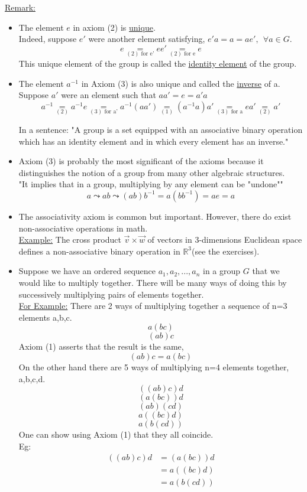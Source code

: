 \documentclass{article}
\theoremstyle{definition}
\begin{document}
\noindent\underline{Remark:}
\begin{itemize} 
    \item The element $e$ in axiom (2) is \underline{unique}.\\
Indeed, suppose $e'$ were another element satisfying, $e'a=a=ae',\ \ \forall a\in G$.
$$e\underset{(2)\text{ for e'}}{=}ee'\underset{(2)\text{ for e}}{=}e$$
This unique element of the group is called the \underline{identity element} of the group.

    \item The element $a^{-1}$ in Axiom (3) is also unique and called the \underline{inverse} of a.\\
    Suppose $a'$ were an element such that $aa'=e=a'a$
    $$a^{-1}\underset{(2)}{=}a^{-1}e\underset{(3)\text{ for a'}}{=}a^{-1}(aa')\underset{(1)}{=}(a^{-1}a)a'\underset{(3)\text{ for a}}{=}ea'\underset{(2)}{=}a'$$

    In a sentence: "A group is a set equipped with an associative binary operation which has an identity element and in which every element has an inverse."
    \item Axiom (3) is probably the most significant of the axioms because it distinguishes the notion of a group from many other algebraic structures.\\
    "It implies that in a group, multiplying by any element can be "undone""
    $$a\leadsto ab\leadsto (ab)b^{-1}=a(bb^{-1})=ae=a$$
    \item The associativity axiom is common but important. However, there do exist non-associative operations in math.\\
    \underline{Example:} The cross product $\vec{v}\times\vec{w}$ of vectors in 3-dimensions Euclidean space defines a non-associative binary operation in $\mathbb{R}^3$(see the exercises).
    \item Suppose we have an ordered sequence $a_1,a_2,...,a_n$ in a group $G$ that we would like to multiply together. There will be many ways of doing this by successively multiplying pairs of elements together.\\
    \underline{For Example:} There are 2 ways of multiplying together a sequence of n=3 elements a,b,c.
    $$a(bc)$$
    $$(ab)c$$
    Axiom (1) asserts that the result is the same,
    $$(ab)c=a(bc)$$
    On the other hand there are 5 ways of multiplying n=4 elements together, a,b,c,d.
    $$((ab)c)d$$
    $$(a(bc))d$$
    $$(ab)(cd)$$
    $$a((bc)d)$$
    $$a(b(cd))$$
    One can show using Axiom (1) that they all coincide.\\
    \noindent Eg: \begin{eqnarray*}
        ((ab)c)d&= (a(bc))d\\
        &=a((bc)d)\\
        &=a(b(cd))
    \end{eqnarray*}
\end{itemize}
\end{document}
